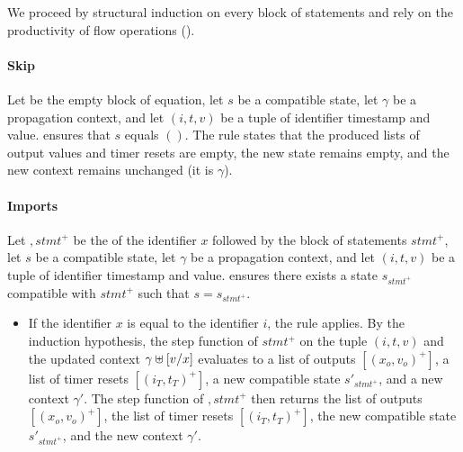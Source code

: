 \begin{skippableproof}
    We proceed by structural induction on every block of statements and rely on the productivity of
    flow operations ().

    \paragraph{Skip}
    Let \skp be the empty block of equation, let $s$ be a compatible state, let $\gamma$ be a
    propagation context, and let $(i, t, v)$ be a tuple of identifier timestamp and value.
     ensures that $s$ equals $()$.
    The rule  states that the produced lists of
    output values and timer resets are empty, the new state remains empty, and the new context
    remains unchanged (\ie it is $\gamma$).

    \paragraph{Imports}
    Let $, stmt^+$ be the  of the identifier $x$ followed by the block
    of statements $stmt^+$, let $s$ be a compatible state, let $\gamma$ be a propagation context,
    and let $(i, t, v)$ be a tuple of identifier timestamp and value.
     ensures there exists a state $s_{stmt^+}$
    compatible with $stmt^+$ such that $s = s_{stmt^+}$.

    \begin{itemize}
        \item If the identifier $x$ is equal to the identifier $i$, the rule  applies.
              By the induction hypothesis, the step function of $stmt^+$ on the tuple $(i, t, v)$
              and the updated context $\gamma \uplus [v/x]$ evaluates to a list of outputs
              $[(x_o, v_o)^+]$, a list of timer resets $[(i_T, t_T)^+]$, a new compatible state
              $s'_{stmt^+}$, and a new context $\gamma'$.
              The step function of $, stmt^+$ then returns the list of outputs
              $[(x_o, v_o)^+]$, the list of timer resets $[(i_T, t_T)^+]$, the new compatible state
              $s'_{stmt^+}$, and the new context $\gamma'$.


\end{itemize}
\end{skippableproof}
